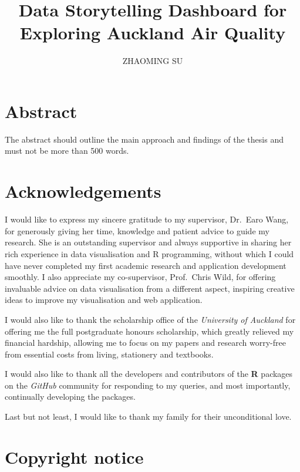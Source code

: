 \documentclass{aucklandthesis}
\author{ZHAOMING SU}
\title{Data Storytelling Dashboard for Exploring Auckland Air Quality}
\begin{document}

\titlepage

{\rm\tighttoc\doublespacing}

\hypertarget{abstract}{%
\chapter*{Abstract}\label{abstract}}

The abstract should outline the main approach and findings of the thesis and must not be more than 500 words.

\newpage

\hypertarget{acknowledgements}{%
\chapter*{Acknowledgements}\label{acknowledgements}}

I would like to express my sincere gratitude to my supervisor, Dr.~Earo Wang, for generously giving her time, knowledge and patient advice to guide my research. She is an outstanding supervisor and always supportive in sharing her rich experience in data visualisation and R programming, without which I could have never completed my first academic research and application development smoothly. I also appreciate my co-supervisor, Prof.~Chris Wild, for offering invaluable advice on data visualisation from a different aspect, inspiring creative ideas to improve my visualisation and web application.

I would also like to thank the scholarship office of the \emph{University of Auckland} for offering me the full postgraduate honours scholarship, which greatly relieved my financial hardship, allowing me to focus on my papers and research worry-free from essential costs from living, stationery and textbooks.

I would also like to thank all the developers and contributors of the \textbf{R} packages on the \emph{GitHub} community for responding to my queries, and most importantly, continually developing the packages.

Last but not least, I would like to thank my family for their unconditional love.

\hypertarget{copyright-notice}{%
\chapter*{Copyright notice}\label{copyright-notice}}
\end{document}
